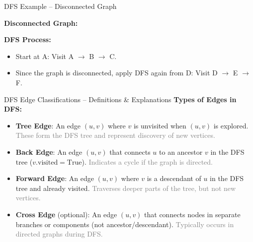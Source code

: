 \documentclass{beamer}
\begin{document}
\begin{frame}{DFS Example – Disconnected Graph}

    \textbf{Disconnected Graph:}

    \begin{center}
    \end{center}

    \vspace{1em}
    \textbf{DFS Process:}
    \begin{itemize}
        \item Start at A: Visit A $\rightarrow$ B $\rightarrow$ C.
        \item Since the graph is disconnected, apply DFS again from D: Visit D $\rightarrow$ E $\rightarrow$ F.
    \end{itemize}
\end{frame}

\begin{frame}{DFS Edge Classifications – Definitions \& Explanations}
    \textbf{Types of Edges in DFS:}
    \begin{itemize}
        \item \textbf{Tree Edge}: An edge \( (u, v) \) where \( v \) is unvisited when \( (u, v) \) is explored.  
        \textcolor{gray}{\small These form the DFS tree and represent discovery of new vertices.}

        \item \textbf{Back Edge}: An edge \( (u, v) \) that connects \( u \) to an ancestor \( v \) in the DFS tree (\( v.\mathrm{visited} = \mathrm{True} \)).  
        \textcolor{gray}{\small Indicates a cycle if the graph is directed.}

        \item \textbf{Forward Edge}: An edge \( (u, v) \) where \( v \) is a descendant of \( u \) in the DFS tree and already visited.  
        \textcolor{gray}{\small Traverses deeper parts of the tree, but not new vertices.}

        \item \textbf{Cross Edge} (optional): An edge \( (u, v) \) that connects nodes in separate branches or components (not ancestor/descendant).  
        \textcolor{gray}{\small Typically occurs in directed graphs during DFS.}
    \end{itemize}
\end{frame}
\end{document}
